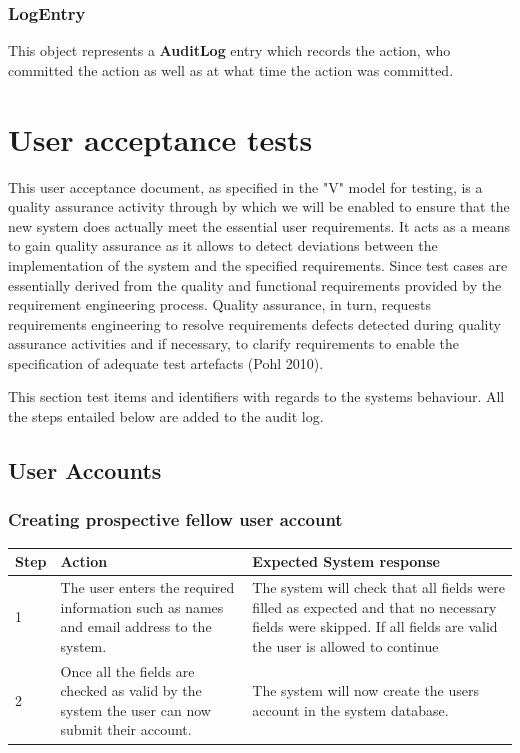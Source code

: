 \documentclass[12pt]{article}
\begin{document}
\subsubsection{LogEntry}
This object represents a \textbf{AuditLog} entry which records the action, who committed the action as well as at what time the action was committed.

\newpage

\section{User acceptance tests}
This user acceptance document, as specified in the "V" model for testing, is a quality assurance activity through by which we will be enabled to ensure that the new system does actually meet the essential user requirements. It acts as a means to gain quality assurance as it allows to detect deviations between the implementation of the system and the specified requirements. Since test cases are essentially derived from the quality and functional requirements provided by the requirement engineering process. Quality assurance, in turn, requests requirements engineering to resolve  requirements defects detected during quality assurance activities and if necessary, to clarify requirements to enable the specification of adequate test artefacts (Pohl 2010).

This section test items and identifiers with regards to the systems behaviour. All the steps entailed below are added to the audit log.

\subsection{User Accounts}

\subsubsection{Creating prospective fellow user account}

\begin{center}
\begin{tabular}{|l|p{6cm}|p{8cm}|}
\hline
Step & Action & Expected System response \\
\hline
1 & The user enters the required information such as names and email address to the system.  & The system will check that all fields were filled as expected and that no necessary fields were skipped. If all fields are valid the user is allowed to continue \\
\hline
2 & Once all the fields are checked as valid by the system the user can now submit their account. & The system will now create the users account in the system database. \\
\hline
\end{tabular}
\end{center}
\end{document}
